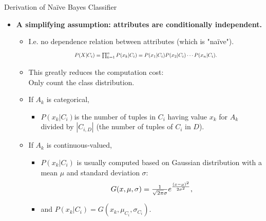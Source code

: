 \begin{frame}{Derivation of Naïve Bayes Classifier}
  \begin{itemize}
  \item \textbf{A simplifying assumption: attributes are {\color{airforceblue}conditionally independent}.}
    \begin{itemize}
    \item I.e. no dependence relation between attributes (which is "naïve").
      \begin{align*}
        \resizebox{7cm}{!}{%
        $P(X|C_i) = \prod_{k=1}^{n} P(x_k|C_i) = P(x_1|C_i)P(x_2|C_i)\cdots P(x_n|C_i).$}
      \end{align*}
    \item This greatly reduces the computation cost:\\
      Only count the class distribution.
    \item If $A_k$ is categorical,
      \begin{itemize}
      \item $P(x_k|C_i)$is the number of tuples in $C_i$ having value $x_k$ for $A_k$ \\
        divided by $|C_{i,D}|$ (the number of tuples of $C_i$ in $D$).
      \end{itemize}
    \item If $A_k$ is continuous-valued,
      \begin{itemize}
      \item $P(x_k|C_i)$ is usually computed based on Gaussian distribution with a mean $\mu$ and standard deviation $\sigma$:
        \begin{align*}
          \resizebox{4cm}{!}{%
          $G(x,\mu,\sigma) = \frac{1}{\sqrt{2\pi}\sigma}e^{\frac{(x-\mu)^2}{2\sigma^2}},$}
        \end{align*}
      \item and $P(x_k|C_i) = G(x_k,\mu_{C_i},\sigma_{C_i})$.
      \end{itemize}
    \end{itemize}
  \end{itemize}
\end{frame}

